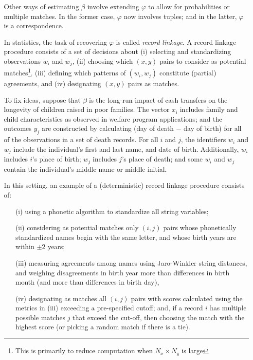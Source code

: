 \documentclass[12pt]{article}
\begin{document}
Other ways of estimating $\beta$ involve extending $\varphi$ to allow for probabilities or multiple matches.  In the former case, $\varphi$ now involves tuples; and in the latter, $\varphi$ is a correspondence. 

In statistics, the task of recovering $\varphi$ is called \textit{record linkage}.  A record linkage procedure consists of a set of decisions about (i) selecting and standardizing observations $w_i$ and $w_j$, (ii) choosing which $(x,y)$ pairs to consider as potential matches\footnote{This is primarily to reduce computation when $N_x \times N_y$ is large}, (iii) defining which patterns of $(w_i,w_j)$ constitute (partial) agreements, and (iv) designating $(x,y)$ pairs as matches.

To fix ideas, suppose that $\beta$ is the long-run impact of cash transfers on the longevity of children raised in poor families.  The vector $x_i$ includes family and child characteristics as observed in welfare program applications; and the outcomes $y_j$ are constructed by calculating (day of death $-$ day of birth) for all of the observations in a set of death records.  For all $i$ and $j$, the identifiers $w_i$ and $w_j$ include the individual's first and last name, and date of birth.  Additionally, $w_i$ includes $i$'s place of birth; $w_j$ includes $j$'s place of death; and some $w_i$ and $w_j$ contain the individual's middle name or middle initial. 



In this setting, an example of a (deterministic) record linkage procedure consists of: 
\begin{enumerate}
\item[(i)] using a phonetic algorithm to standardize all string variables; 
\item[(ii)] considering as potential matches only $(i,j)$ pairs whose phonetically standardized names begin with the same letter, and whose birth years are within $\pm$2 years;
\item[(iii)] measuring agreements among names using Jaro-Winkler string distances, and weighing disagreements in birth year more than differences in birth month (and more than differences in birth day), 
\item[(iv)] designating as matches all $(i,j)$ pairs with scores calculated using the metrics in (iii) exceeding a pre-specified cutoff; and, if a record $i$ has multiple possible matches $j$ that exceed the cut-off, then choosing the match with the highest score (or picking a random match if there is a tie).  
\end{enumerate}
\end{document}
